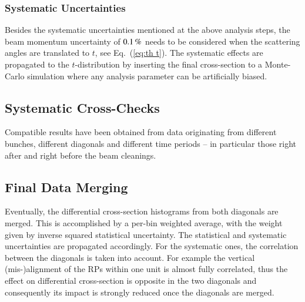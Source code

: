 
\subsubsection{Systematic Uncertainties}
\label{sec:systematics}

Besides the systematic uncertainties mentioned at the above analysis steps, the beam momentum uncertainty of $0.1\,{\rm \%}$ needs to be considered when the scattering angles are translated to $t$, see Eq.~(\ref{eq:th t}). The systematic effects are propagated to the $t$-distribution by inserting the final cross-section to a Monte-Carlo simulation where any analysis parameter can be artificially biased. 



\subsection{Systematic Cross-Checks}
\label{sec:cross checks}

Compatible results have been obtained from data originating from different bunches, different diagonals and different time periods -- in particular those right after and right before the beam cleanings.



\subsection{Final Data Merging}
\label{sec:final data merging}

Eventually, the differential cross-section histograms from both diagonals are merged. This is accomplished by a per-bin weighted average, with the weight given by inverse squared statistical uncertainty. The statistical and systematic uncertainties are propagated accordingly. For the systematic ones, the correlation between the diagonals is taken into account. For example the vertical (mis-)alignment of the RPs within one unit is almost fully correlated, thus the effect on differential cross-section is opposite in the two diagonals and consequently its impact is strongly reduced once the diagonals are merged.

